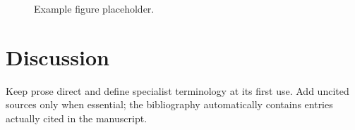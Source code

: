 \documentclass[review]{journalofnichenlp}
\begin{document}
\begin{figure}[htbp]
  \centering
  \caption{Example figure placeholder.}
  \label{fig:workflow}
\end{figure}

\section{Discussion}
Keep prose direct and define specialist terminology at its first use. Add uncited sources only when essential; the bibliography automatically contains entries actually cited in the manuscript.


\end{document}
